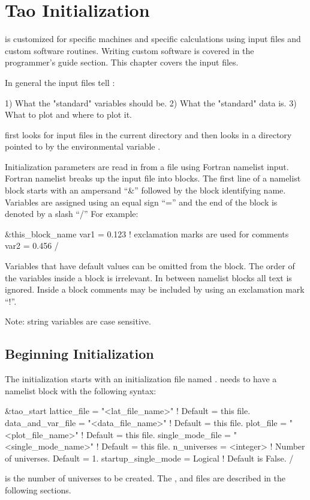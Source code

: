 \chapter{Tao Initialization}
\label{c:init}

\tao is customized for specific machines and specific calculations
using input files and custom software routines. Writing custom software is
covered in the programmer's guide section. This chapter covers the
input files. 

In general the input files tell \tao:
\begin{example}
  1) What the "standard" variables should be.
  2) What the "standard" data is.
  3) What to plot and where to plot it.
\end{example}

\tao first looks for input files in the current directory and then
looks in a directory pointed to by the environmental variable
.

Initialization parameters are read in from a file using Fortran
namelist input. Fortran namelist breaks up the input file into
blocks. The first line of a namelist block starts with an ampersand ``\&''
followed by the block identifying name. Variables are assigned using
an equal sign ``='' and the end of the block is denoted by a slash ``/''
For example:
\begin{example}
  \&this_block_name
    var1 = 0.123   ! exclamation marks are used for comments
    var2 = 0.456
  /
\end{example}
Variables that have default values can be omitted from the block.  The
order of the variables inside a block is irrelevant.  In between
namelist blocks all text is ignored. Inside a block comments may be
included by using an exclamation mark ``!''.

Note: string variables are case sensitive.

\section{Beginning Initialization}
\label{s:init_global} 

The initialization starts with an initialization file named . 
 needs to have a  namelist block with the following syntax:
\begin{example}
  \&tao_start
    lattice_file      = "<lat_file_name>"    ! Default = this file.
    data_and_var_file = "<data_file_name>"   ! Default = this file.
    plot_file         = "<plot_file_name>"   ! Default = this file.
    single_mode_file  = "<single_mode_name>" ! Default = this file.
    n_universes       = <integer>            ! Number of universes. Default = 1.
    startup_single_mode = Logical            ! Default is False.
  /
\end{example}
 is the number of universes to be created. The 
, and  files are described in the following sections.

